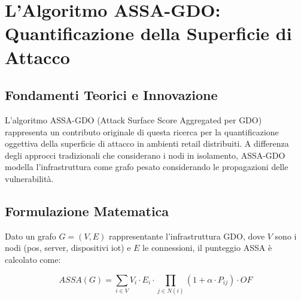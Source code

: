 


\section{\texorpdfstring{L'Algoritmo ASSA-GDO: Quantificazione della Superficie di Attacco}{2.4 - L'Algoritmo ASSA-GDO: Quantificazione della Superficie di Attacco}}

\subsection{\texorpdfstring{Fondamenti Teorici e Innovazione}{2.4.1 - Fondamenti Teorici e Innovazione}}

L'algoritmo ASSA-GDO (Attack Surface Score Aggregated per GDO) rappresenta un contributo originale di questa ricerca per la quantificazione oggettiva della superficie di attacco in ambienti retail distribuiti. A differenza degli approcci tradizionali che considerano i nodi in isolamento, ASSA-GDO modella l'infrastruttura come grafo pesato considerando le propagazioni delle vulnerabilità.

\subsection{\texorpdfstring{Formulazione Matematica}{2.4.2 - Formulazione Matematica}}

Dato un grafo $G = (V, E)$ rappresentante l'infrastruttura GDO, dove $V$ sono i nodi (\gls{pos}, server, dispositivi \gls{iot}) e $E$ le connessioni, il punteggio ASSA è calcolato come:

\begin{equation}
ASSA(G) = \sum_{i \in V} V_i \cdot E_i \cdot \prod_{j \in N(i)} (1 + \alpha \cdot P_{ij}) \cdot OF
\end{equation}


